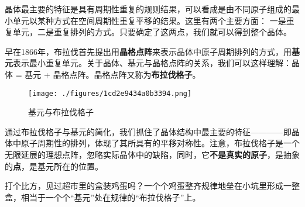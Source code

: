 
晶体最主要的特征是具有周期性重复的规则结果，可以看成是由不同原子组成的最小单元以某种方式在空间周期性重复平移的结果。这里有两个主要方面：
一是重复单元，二是重复排列的方式。只要确定了这两点，我们就可以得到整个晶体。

早在1866年，布拉伐首先提出用\textbf{晶格点阵}来表示晶体中原子周期排列的方式，用\textbf{基元}表示最小重复单元。关于晶体、基元与晶格点阵的关系，我们可以这样理解：晶体 = 基元 + 晶格点阵。晶格点阵又称为\textbf{布拉伐格子}。
\begin{figure}[ht]
\centering
\texttt{[image: ./figures/1cd2e9434a0b3394.png]}
\caption{ 基元与布拉伐格子} \label{fig_BraLat_1}
\end{figure}

通过布拉伐格子与基元的简化，我们抓住了晶体结构中最主要的特征————即晶体中原子周期性的排列，体现了其所具有的平移对称性。注意，布拉伐格子是一个无限延展的理想点阵，忽略实际晶体中的缺陷，同时，它\textbf{不是真实的原子}，是抽象的\textbf{点}，是基元所在的位置。

打个比方，见过超市里的盒装鸡蛋吗？一个个鸡蛋整齐规律地垒在小坑里形成一整盒，相当于一个个“基元”处在规律的“布拉伐格子”上。